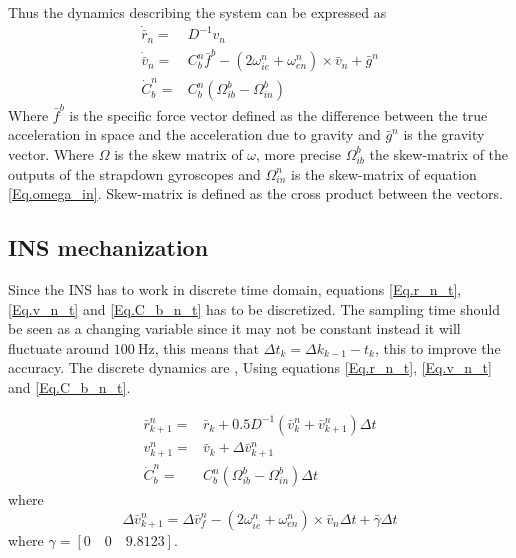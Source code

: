 \noindent Thus the dynamics describing the system can be expressed as
\begin{align}
\dot{\bar{r}}_n = & D^{-1}v_n
\label{Eq.r_n_t}\\
\dot{\bar{v}}_n = & C_b^n \bar{f}^b-(2\omega_{ie}^n+\omega_{en}^n) \times \bar{v}_n +\bar{g}^n
\label{Eq.v_n_t}\\
\dot{C}_b^n = & C_b^n(\Omega_{ib}^b - \Omega_{in}^b)
\label{Eq.C_b_n_t}
\end{align}
Where $\bar{f}^b$ is the specific force vector defined as the difference between the true acceleration in space and the acceleration due to gravity and $\bar{g}^n$ is the gravity vector. Where $\Omega$ is the skew matrix of $\omega$, more precise $\Omega_{ib}^b$ the skew-matrix of the outputs of the strapdown gyroscopes and $\Omega_{in}^n$ is the skew-matrix of equation \eqref{Eq.omega_in}. Skew-matrix is defined as the cross product between the vectors.

\subsection{INS mechanization}
Since the INS has to work in discrete time domain, equations \eqref{Eq.r_n_t}, \eqref{Eq.v_n_t} and \eqref{Eq.C_b_n_t} has to be discretized. The sampling time should be seen as a changing variable since it may not be constant instead it will fluctuate around $100~\textrm{Hz}$, this means that $\Delta t_k = \Delta k_{k-1} - t_{k}$, this to improve the accuracy. The discrete dynamics are \cite{non-linear}, Using equations \eqref{Eq.r_n_t}, \eqref{Eq.v_n_t} and \eqref{Eq.C_b_n_t}.

\begin{align}
\bar{r}_{k+1}^n = & \bar{r}_k + 0.5D^{-1}(\bar{v}_k^n + \bar{v}_{k+1}^n)\Delta t
\label{Eq.r_n_d}\\
v_{k+1}^n= & \bar{v}_k + \Delta \bar{v}_{k+1}^n
\label{Eq.v_n_d}\\
\dot{C}_b^n = & C_b^n(\Omega_{ib}^b - \Omega_{in}^b)\Delta t
\label{Eq.C_b_n_d}
\end{align}
where 
\begin{equation}
\Delta \bar{v}_{k+1}^n = \Delta \bar{v}_f^n - (2\omega_{ie}^n+\omega_{en}^n) \times \bar{v}_n \Delta t +\bar{\gamma}\Delta t
\end{equation}
where $\gamma = [0 \quad 0 \quad 9.8123]$.

